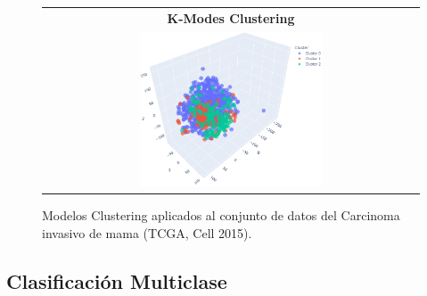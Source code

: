 \begin{figure}
	\setlength\tabcolsep{3pt}%
	\centering
	\begin{tabular}{c}
		\textbf{K-Modes Clustering} \\
		\includegraphics[width=0.5\textwidth]{NOTEBOOK/IMAGENES_CLUSTERING/TNSE_Kmodes}
	\end{tabular}
	\caption{Modelos Clustering aplicados al conjunto de datos del Carcinoma invasivo de mama (TCGA, Cell 2015). }
	\label{Clustering_Models_graphics}
\end{figure}


 

\subsection{Clasificación Multiclase}
